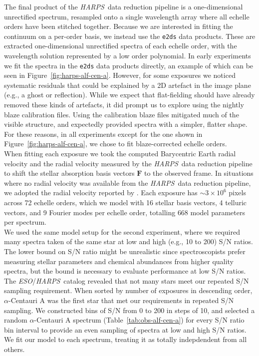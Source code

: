 \documentclass[modern]{aastex631}
\newcommand{\project}[1]{\textit{#1}}
\renewcommand{\vec}[1]{\mathbf{#1}}
\newcommand{\eso}{\project{ESO}}
\newcommand{\harps}{\project{HARPS}}
\newcommand{\todo}[1]{\textcolor{tab:red}{#1}}
\begin{document}
The final product of the \harps\ data reduction pipeline is a one-dimensional unrectified spectrum, resampled onto a single wavelength array where all echelle orders have been stitched together. Because we are interested in fitting the continuum on a per-order basis, we instead use the \texttt{e2ds} data products. These are extracted one-dimensional unrectified spectra of each echelle order, with the wavelength solution represented by a low order polynomial. In early experiments we fit the spectra in the \texttt{e2ds} data products directly, an example of which can be seen in Figure~\ref{fig:harps-alf-cen-a}. However, for some exposures we noticed systematic residuals that could be explained by a 2D artefact in the image plane (e.g., a ghost or reflection). While we expect that flat-fielding should have already removed these kinds of artefacts, it did prompt us to explore using the nightly blaze calibration files. Using the calibration blaze files mitigated much of the visible structure, and expectedly provided spectra with a simpler, flatter shape. For these reasons, in all experiments except for the one shown in Figure~\ref{fig:harps-alf-cen-a}, we chose to fit blaze-corrected echelle orders.\\

When fitting each exposure we took the computed Barycentric Earth radial velocity and the radial velocity measured by the \harps\ data reduction pipeline to shift the stellar absorption basis vectors $\vec{F}$ to the observed frame. In situations where no radial velocity was available from the \harps\ data reduction pipeline, we adopted the radial velocity reported by \citep{Someone}. Each exposure has $\sim3\times10^6$ pixels across 72 echelle orders, which we model with 16 stellar basis vectors, 4 telluric vectors, and \todo{9} Fourier modes per echelle order, totalling \todo{668} model parameters per spectrum.\\

We used the same model setup for the second experiment, where we required many spectra taken of the same star at low and high (e.g., 10 to 200) S/N ratios. The lower bound on S/N ratio might be unrealistic since spectroscopists prefer measuring stellar parameters and chemical abundances from higher quality spectra, but the bound is necessary to evaluate performance at low S/N ratios. The \eso/\harps\ catalog revealed that not many stars meet our repeated S/N sampling requirement. When sorted by number of exposures in descending order, $\alpha$-Centauri A was the first star that met our requirements in repeated S/N sampling. We constructed bins of S/N from 0 to 200 in steps of 10, and selected a random $\alpha$-Centauri A spectrum (Table~\ref{tab:obs-alf-cen-a}) for every S/N ratio bin interval to provide an even sampling of spectra at low and high S/N ratios. We fit our model to each spectrum, treating it as totally indepdendent from all others.\\
\end{document}
